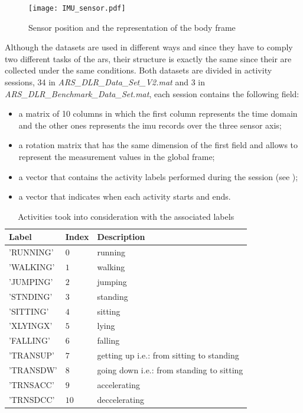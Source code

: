 \begin{figure}[htp]
\texttt{[image: IMU\_sensor.pdf]}
\caption{Sensor position and the representation of the body frame}
\label{fig:IMU}
\end{figure}

Although the datasets are used in different ways and since they have to comply two different tasks of the \gls{ars}, their structure is exactly the same since their are collected under the same conditions.
Both datasets are divided in activity sessions, 34 in \textit{ARS\_DLR\_Data\_Set\_V2.mat} and 3 in \textit{ARS\_DLR\_Benchmark\_Data\_Set.mat}, each session contains the following field:
\begin{itemize}
\item a matrix of 10 columns in which the first column represents the time domain and the other ones represents the \gls{imu} records over the three sensor axis;
\item a rotation matrix that has the same dimension of the first field and allows to represent the measurement values in the global frame;
\item a vector that contains the activity labels performed during the session (see );
\item a vector that indicates when each activity starts and ends.
\end{itemize}

\begin{table}[htp]
\small
	\centering
		\renewcommand{\arraystretch}{1}%
	\begin{tabular}{@{}lll@{}}
	\toprule
	Label & Index & Description\\ \midrule
	'RUNNING' & $0$ & running \\
	'WALKING' & $1$ & walking \\
	'JUMPING' & $2$ & jumping  \\
	'STNDING' & $3$ & standing \\
	'SITTING' & $4$ & sitting\\
	'XLYINGX' & $5$ & lying \\
	'FALLING' & $6$ & falling \\
	'TRANSUP' & $7$ & getting up i.e.: from sitting to standing \\
	'TRANSDW' & $8$ & going down i.e.: from standing to sitting\\
	'TRNSACC' & $9$ & accelerating\\
	'TRNSDCC' & $10$ & deccelerating\\
	\bottomrule
	\end{tabular}
	\caption{Activities took into consideration with the associated labels}
	\label{tab:label}
\end{table}


